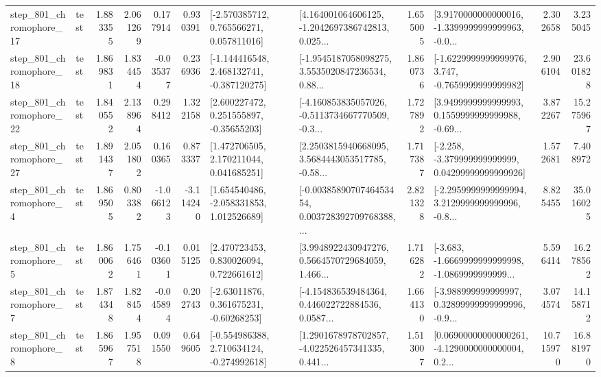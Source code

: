 \begin{tabular}{llrrrrllrlrr}
  step\_801\_chromophore\_17 &      test &      1.883355 &    2.061269 &      0.177914 &  0.930391 &    [-2.570385712, 0.765566271, 0.057811016] &  [4.164001064606125, -1.2042697386742813, 0.025... &       1.655005 &  [3.9170000000000016, -1.3399999999999963, -0.0... &            2.302658 &          3.235045 \\
  step\_801\_chromophore\_18 &      test &      1.869831 &    1.834454 &     -0.035377 &  0.236936 &   [-1.144416548, 2.468132741, -0.387120275] &  [-1.9545187058098275, 3.5535020847236534, 0.88... &       1.860736 &  [-1.6229999999999976, 3.747, -0.7659999999999982] &            2.906104 &         23.601828 \\
  step\_801\_chromophore\_22 &      test &      1.840552 &    2.138964 &      0.298412 &  1.322158 &     [2.600227472, 0.251555897, -0.35655203] &  [-4.160853835057026, -0.5113734667770509, -0.3... &       1.727892 &  [3.9499999999999993, 0.1559999999999988, -0.69... &            3.872267 &         15.275967 \\
  step\_801\_chromophore\_27 &      test &      1.891437 &    2.051802 &      0.160365 &  0.873337 &     [1.472706505, 2.170211044, 0.041685251] &  [2.2503815940668095, 3.5684443053517785, -0.58... &       1.717387 &  [-2.258, -3.379999999999999, 0.04299999999999926] &            1.572681 &          7.408972 \\
   step\_801\_chromophore\_4 &      test &      1.869505 &    0.803382 &     -1.066123 & -3.114240 &    [1.654540486, -2.058331853, 1.012526689] &  [-0.0038589070746453454, 0.003728392709768388,... &       2.821328 &  [-2.2959999999999994, 3.2129999999999996, -0.8... &            8.825455 &         35.016025 \\
   step\_801\_chromophore\_5 &      test &      1.860062 &    1.756461 &     -0.103601 &  0.015125 &     [2.470723453, 0.830026094, 0.722661612] &  [3.9948922430947276, 0.5664570729684059, 1.466... &       1.716282 &  [-3.683, -1.6669999999999998, -1.0869999999999... &            5.596414 &         16.278562 \\
   step\_801\_chromophore\_7 &      test &      1.874348 &    1.828454 &     -0.045894 &  0.202743 &     [-2.63011876, 0.361675231, -0.60268253] &  [-4.154836539484364, 0.446022722884536, 0.0587... &       1.664130 &  [-3.988999999999997, 0.32899999999999996, -0.9... &            3.074574 &         14.158712 \\
   step\_801\_chromophore\_8 &      test &      1.865967 &    1.957518 &      0.091550 &  0.649605 &   [-0.554986388, 2.710634124, -0.274992618] &  [1.2901678978702857, -4.022526457341335, 0.441... &       1.513007 &  [0.06900000000000261, -4.1290000000000004, 0.2... &           10.715970 &         16.881970 \\

\end{tabular}
